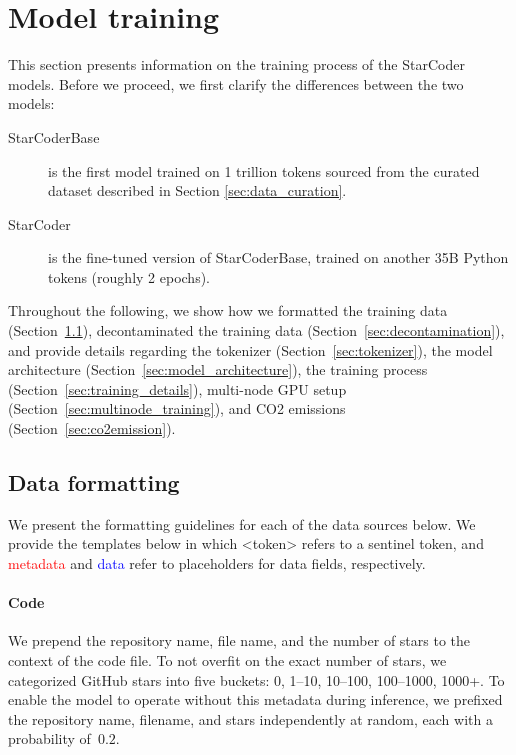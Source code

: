 \section{Model training}\label{sec:model_training}
This section presents information on the training process of the StarCoder models. Before we proceed, we first clarify the differences between the two models:

\begin{description}
\item[StarCoderBase] is the first model trained on 1 trillion tokens sourced from the curated dataset described in Section \ref{sec:data_curation}. 

\item[StarCoder] is the fine-tuned version of StarCoderBase, trained on another 35B Python tokens (roughly 2 epochs).  
\end{description}

Throughout the following, we show how we formatted the training data (Section~\ref{sec:data_formatting}), decontaminated the training data (Section~\ref{sec:decontamination}), and provide details regarding the tokenizer (Section~\ref{sec:tokenizer}), the model architecture (Section~\ref{sec:model_architecture}), the training process (Section~\ref{sec:training_details}),  multi-node GPU setup (Section~\ref{sec:multinode_training}), and CO2 emissions (Section~\ref{sec:co2emission}). 

\subsection{Data formatting}\label{sec:data_formatting}
We present the formatting guidelines for each of the data sources below. We provide the templates below in which <token> refers to a sentinel token, and \textcolor{red}{metadata} and \textcolor{blue}{data} refer to placeholders for data fields, respectively. 

\paragraph{Code} We prepend the repository name, file name, and the number of stars to the context of the code file. To not overfit on the exact number of stars, we categorized GitHub stars into five buckets: 0, 1--10, 10--100, 100--1000, 1000+. To enable the model to operate without this metadata during inference, we prefixed the repository name, filename, and stars independently at random, each with a probability of~$0.2$.

